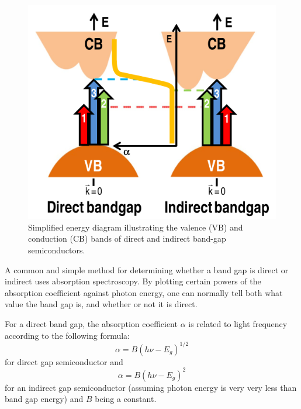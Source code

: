\documentclass[%
 aip,
 amsmath,amssymb,
 reprint,%
]{revtex4-1}
\begin{document}
\begin{figure}
    \centering
    \includegraphics[scale = 0.6]{Figures/simplified-energy-diagram.png}
    \caption{Simplified energy diagram illustrating the valence (VB) and conduction (CB) bands of direct and
indirect band-gap semiconductors.}
    \label{fig:bandgaps}
\end{figure}

A common and simple method for determining whether a band gap is direct or indirect uses absorption spectroscopy. By plotting certain powers of the absorption coefficient against photon energy, one can normally tell both what value the band gap is, and whether or not it is direct.
\par
For a direct band gap, the absorption coefficient $\alpha$ is related to light frequency according to the following formula:
\begin{equation}
    \alpha = B (h \nu - E_g)^{1/2}
\end{equation}
for direct gap semiconductor and
\begin{equation}
    \alpha = B (h \nu - E_g)^2
\end{equation}
for an indirect gap semiconductor (assuming photon energy is very very less than band gap energy) and $B$ being a constant.
\end{document}

